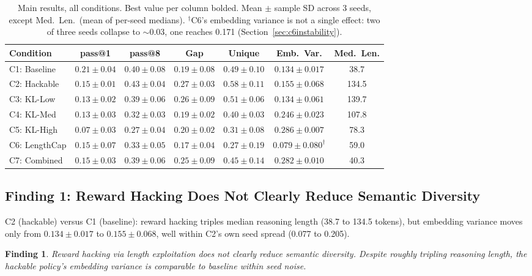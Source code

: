 \documentclass{article}
\newtheorem{finding}{Finding}
\begin{document}
\begin{table}[h]
\centering
\caption{Main results, all conditions. Best value per column bolded. Mean $\pm$ sample SD across 3 seeds, except Med.\ Len.\ (mean of per-seed medians). $^\dagger$C6's embedding variance is not a single effect: two of three seeds collapse to $\sim$0.03, one reaches 0.171 (Section~\ref{sec:c6instability}).}
\label{tab:results}
\small
\begin{tabular}{lcccccc}
\toprule
\textbf{Condition} & \textbf{pass@1} & \textbf{pass@8} & \textbf{Gap} & \textbf{Unique} & \textbf{Emb.\ Var.} & \textbf{Med.\ Len.} \\
\midrule
C1: Baseline & $\mathbf{0.21\pm0.04}$ & $0.40\pm0.08$ & $0.19\pm0.08$ & $0.49\pm0.10$ & $0.134\pm0.017$ & 38.7 \\
C2: Hackable & $0.15\pm0.01$ & $\mathbf{0.43\pm0.04}$ & $\mathbf{0.27\pm0.03}$ & $\mathbf{0.58\pm0.11}$ & $0.155\pm0.068$ & 134.5 \\
C3: KL-Low & $0.13\pm0.02$ & $0.39\pm0.06$ & $0.26\pm0.09$ & $0.51\pm0.06$ & $0.134\pm0.061$ & 139.7 \\
C4: KL-Med & $0.13\pm0.03$ & $0.32\pm0.03$ & $0.19\pm0.02$ & $0.40\pm0.03$ & $0.246\pm0.023$ & 107.8 \\
C5: KL-High & $0.07\pm0.03$ & $0.27\pm0.04$ & $0.20\pm0.02$ & $0.31\pm0.08$ & $\mathbf{0.286\pm0.007}$ & 78.3 \\
C6: LengthCap & $0.15\pm0.07$ & $0.33\pm0.05$ & $0.17\pm0.04$ & $0.27\pm0.19$ & $0.079\pm0.080^\dagger$ & 59.0 \\
C7: Combined & $0.15\pm0.03$ & $0.39\pm0.06$ & $0.25\pm0.09$ & $0.45\pm0.14$ & $0.282\pm0.010$ & 40.3 \\
\bottomrule
\end{tabular}
\end{table}

\subsection{Finding 1: Reward Hacking Does Not Clearly Reduce Semantic Diversity}

C2 (hackable) versus C1 (baseline): reward hacking triples median reasoning length (38.7 to 134.5 tokens), but embedding variance moves only from $0.134\pm0.017$ to $0.155\pm0.068$, well within C2's own seed spread (0.077 to 0.205).

\begin{finding}
\label{find:hacking}
Reward hacking via length exploitation does not clearly reduce semantic diversity. Despite roughly tripling reasoning length, the hackable policy's embedding variance is comparable to baseline within seed noise.
\end{finding}
\end{document}
